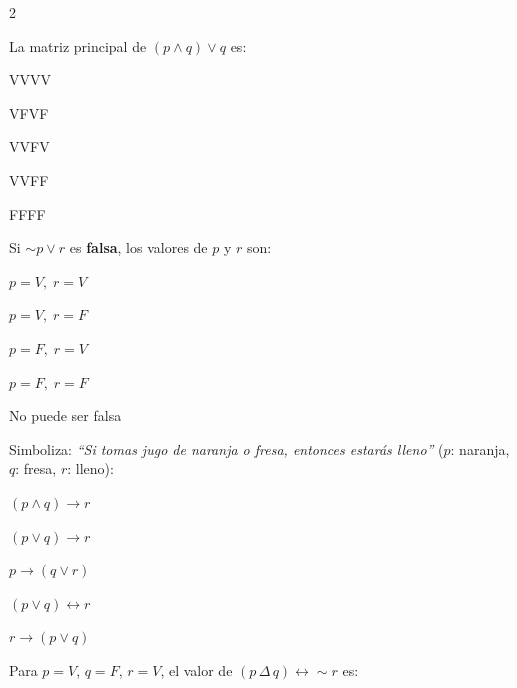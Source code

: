 	\begin{multicols}{2}
		
		\ejercicio La matriz principal de $(p \wedge q) \vee q$ es:
		
		\begin{alternativas}
			\item VVVV
			\item VFVF
			\item VVFV
			\item VVFF
			\item FFFF
		\end{alternativas}
		\vspace{0.3cm}
		
		\ejercicio Si $\sim p \vee r$ es \textbf{falsa}, los valores de $p$ y $r$ son:
		
		\begin{alternativas}
			\item $p = V,\; r = V$
			\item $p = V,\; r = F$
			\item $p = F,\; r = V$
			\item $p = F,\; r = F$
			\item No puede ser falsa
		\end{alternativas}
		\vspace{0.3cm}
		
		\ejercicio Simboliza: \textit{``Si tomas jugo de naranja o fresa, entonces
			estarás lleno''} ($p$: naranja, $q$: fresa, $r$: lleno):
		
		\begin{alternativas}
			\item $(p \wedge q) \to r$
			\item $(p \vee q) \to r$
			\item $p \to (q \vee r)$
			\item $(p \vee q) \leftrightarrow r$
			\item $r \to (p \vee q)$
		\end{alternativas}
		\vspace{0.3cm}
		
		\ejercicio Para $p=V$, $q=F$, $r=V$, el valor de
		$(p \,\Delta\, q) \leftrightarrow \sim r$ es:
		

\end{multicols}
